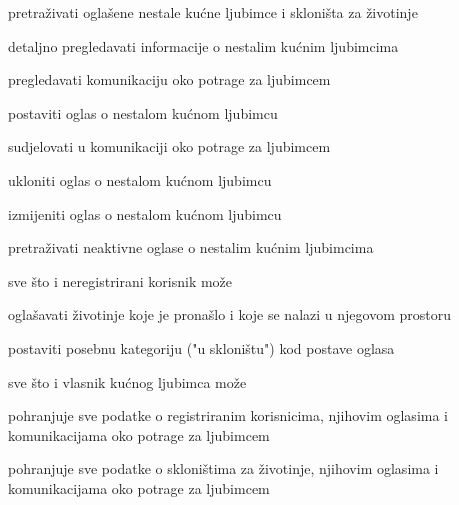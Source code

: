 \begin{packed_enum}
	\item  {}

	\begin{packed_enum}

		\item pretraživati oglašene nestale kućne ljubimce i skloništa za životinje
		\item detaljno pregledavati informacije o nestalim kućnim ljubimcima
		\item  pregledavati komunikaciju oko potrage za ljubimcem

	\end{packed_enum}

	\item  {}

	\begin{packed_enum}

		\item postaviti oglas o nestalom kućnom ljubimcu
		\item sudjelovati u komunikaciji oko potrage za ljubimcem
		\item ukloniti oglas o nestalom kućnom ljubimcu
		\item izmijeniti oglas o nestalom kućnom ljubimcu
		\item pretraživati neaktivne oglase o nestalim kućnim ljubimcima
		\item sve što i neregistrirani korisnik može

	\end{packed_enum}

	\item  {}

	\begin{packed_enum}

		\item oglašavati životinje koje je pronašlo i koje se nalazi u njegovom prostoru
		\item postaviti posebnu kategoriju ("u skloništu") kod postave oglasa
		\item sve što i vlasnik kućnog ljubimca može

	\end{packed_enum}

	\item  {}

	\begin{packed_enum}

		\item pohranjuje sve podatke o registriranim korisnicima, njihovim oglasima i komunikacijama oko potrage za ljubimcem
		\item pohranjuje sve podatke o skloništima za životinje, njihovim oglasima i komunikacijama oko potrage za ljubimcem

	\end{packed_enum}
\end{packed_enum}

